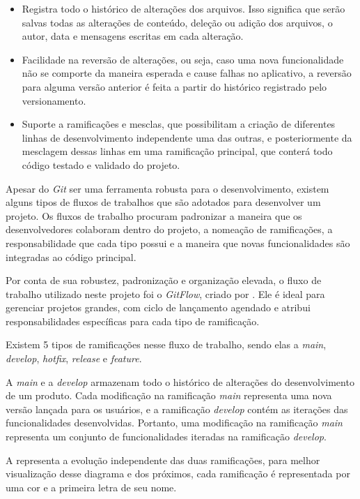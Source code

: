 \begin{itemize}
    \item Registra todo o histórico de alterações dos arquivos. Isso significa que serão salvas todas as alterações de conteúdo, deleção ou adição dos arquivos, o autor, data e mensagens escritas em cada alteração.
    \item Facilidade na reversão de alterações, ou seja, caso uma nova funcionalidade não se comporte da maneira esperada e cause falhas no aplicativo, a reversão para alguma versão anterior é feita a partir do histórico registrado pelo versionamento.
    \item Suporte a ramificações e mesclas, que possibilitam a criação de diferentes linhas de desenvolvimento independente uma das outras, e posteriormente da mesclagem dessas linhas em uma ramificação principal, que conterá todo código testado e validado do projeto.
\end{itemize}

Apesar do \textit{Git} ser uma ferramenta robusta para o desenvolvimento, existem alguns tipos de fluxos de trabalhos que são adotados para desenvolver um projeto. Os fluxos de trabalho procuram padronizar a maneira que os desenvolvedores colaboram dentro do projeto, a nomeação de ramificações, a responsabilidade que cada tipo possui e a maneira que novas funcionalidades são integradas ao código principal.

Por conta de sua robustez, padronização e organização elevada, o fluxo de trabalho utilizado neste projeto foi o \textit{GitFlow}, criado por \textcite{gitflow}. Ele é ideal para gerenciar projetos grandes, com ciclo de lançamento agendado e atribui responsabilidades específicas para cada tipo de ramificação.

Existem 5 tipos de ramificações nesse fluxo de trabalho, sendo elas a \textit{main}, \textit{develop}, \textit{hotfix}, \textit{release} e \textit{feature}.

A \textit{main} e a \textit{develop} armazenam todo o histórico de alterações do desenvolvimento de um produto. Cada modificação na ramificação \textit{main} representa uma nova versão lançada para os usuários, e a ramificação \textit{develop} contém as iterações das funcionalidades desenvolvidas. Portanto, uma modificação na ramificação \textit{main} representa um conjunto de funcionalidades iteradas na ramificação \textit{develop}.

A  representa a evolução independente das duas ramificações, para melhor visualização desse diagrama e dos próximos, cada ramificação é representada por uma cor e a primeira letra de seu nome. 

